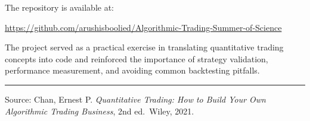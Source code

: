\documentclass[12pt, a4paper]{article}
\begin{document}
The repository is available at:
\begin{center}
\url{https://github.com/arushisboolied/Algorithmic-Trading-Summer-of-Science}
\end{center}

The project served as a practical exercise in translating quantitative trading concepts into code and reinforced the importance of strategy validation, performance measurement, and avoiding common backtesting pitfalls.

\vspace{2em}
\textcolor{accentgray}{\hrule}
\vspace{0.5em}
{\small\textcolor{accentgray}{Source: Chan, Ernest P. \textit{Quantitative Trading: How to Build Your Own Algorithmic Trading Business}, 2nd ed.\ Wiley, 2021.}}
\end{document}
